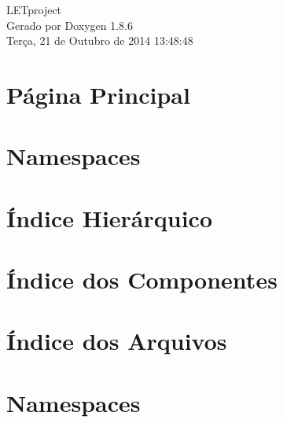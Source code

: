 \documentclass[twoside]{article}
\begin{document}
\hypersetup{pageanchor=false}
\begin{titlepage}
\vspace*{7cm}
\begin{center}%
{\Large L\-E\-Tproject }\\
\vspace*{1cm}
{\large Gerado por Doxygen 1.8.6}\\
\vspace*{0.5cm}
{\small Terça, 21 de Outubro de 2014 13:48:48}\\
\end{center}
\end{titlepage}
\tableofcontents
{}
\hypersetup{pageanchor=true}

\section{Página Principal}
\label{index}\hypertarget{index}{}
\section{Namespaces}

\section{Índice Hierárquico}

\section{Índice dos Componentes}

\section{Índice dos Arquivos}

\section{Namespaces}






























\end{document}
